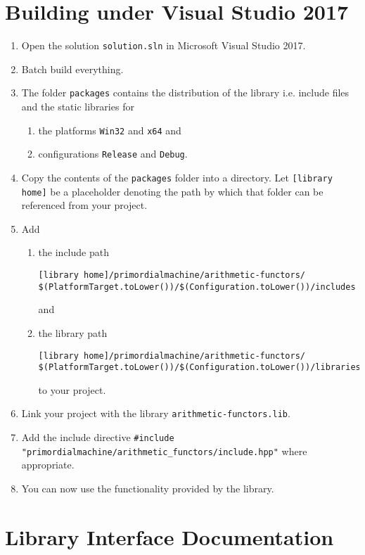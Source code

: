 \documentclass[oneside]{book}
\begin{document}
\chapter{Building under Visual Studio 2017}
\begin{enumerate}
\item Open the solution \texttt{solution.sln} in Microsoft Visual Studio 2017.
\item Batch build everything.
\item The folder \texttt{packages} contains the distribution of the library i.e. include files and the
      static libraries for
  \begin{enumerate}
    \item the platforms \texttt{Win32} and \texttt{x64} and
    \item configurations \texttt{Release} and \texttt{Debug}.
  \end{enumerate}
\item Copy the contents of the \verb+packages+ folder into a directory. Let
      \verb+[library home]+ be a placeholder denoting the path by which that folder
      can be referenced from your project.
\item Add
  \begin{enumerate}
    \item the include path
\begin{verbatim}
[library home]/primordialmachine/arithmetic-functors/
$(PlatformTarget.toLower())/$(Configuration.toLower())/includes
\end{verbatim}
	and
    \item the library path
\begin{verbatim}
[library home]/primordialmachine/arithmetic-functors/
$(PlatformTarget.toLower())/$(Configuration.toLower())/libraries
\end{verbatim}
    to your project.
\end{enumerate}
\item Link your project with the library \verb+arithmetic-functors.lib+.
\item Add the include directive \verb+#include "primordialmachine/arithmetic_functors/include.hpp"+ where appropriate.
\item You can now use the functionality provided by the library.
\end{enumerate}

\chapter{Library Interface Documentation}
\end{document}
